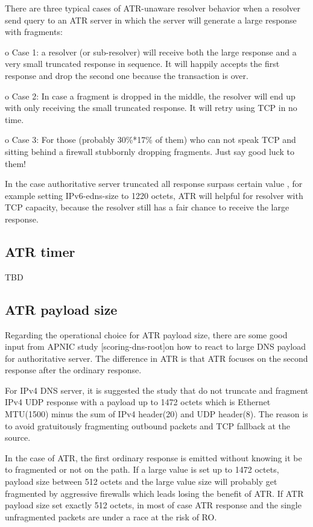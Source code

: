    There are three typical cases of ATR-unaware resolver behavior when a
   resolver send query to an ATR server in which the server will
   generate a large response with fragments:

   o  Case 1: a resolver (or sub-resolver) will receive both the large
   response and a very small truncated response in sequence.  It will
   happily accepts the first response and drop the second one because
   the transaction is over.

    o  Case 2: In case a fragment is dropped in the middle, the resolver
   will end up with only receiving the small truncated response.  It
   will retry using TCP in no time.

   o  Case 3: For those (probably 30\%*17\% of them) who can not speak TCP
      and sitting behind a firewall stubbornly dropping fragments.  Just
      say good luck to them!


   In the case authoritative server truncated all response surpass
   certain value , for example setting IPv6-edns-size to 1220 octets,
   ATR will helpful for resolver with TCP capacity, because the resolver
   still has a fair chance to receive the large response.

   \subsection{ATR timer}

   TBD

   \subsection{ATR payload size}
      Regarding the operational choice for ATR payload size, there are some
   good input from APNIC study [scoring-dns-root]on how to react to
   large DNS payload for authoritative server.  The difference in ATR is
   that ATR focuses on the second response after the ordinary response.

   For IPv4 DNS server, it is suggested the study that do not truncate
   and fragment IPv4 UDP response with a payload up to 1472 octets which
   is Ethernet MTU(1500) minus the sum of IPv4 header(20) and UDP
   header(8).  The reason is to avoid gratuitously fragmenting outbound
   packets and TCP fallback at the source.

   In the case of ATR, the first ordinary response is emitted without
   knowing it be to fragmented or not on the path.  If a large value is
   set up to 1472 octets, payload size between 512 octets and the large
   value size will probably get fragmented by aggressive firewalls which
   leads losing the benefit of ATR.  If ATR payload size set exactly 512
   octets, in most of case ATR response and the single unfragmented
   packets are under a race at the risk of RO.

